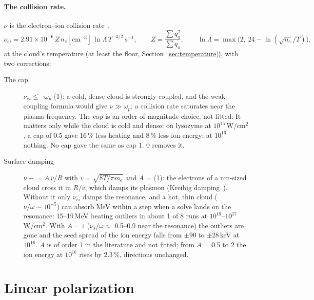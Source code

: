 \paragraph{The collision rate.}
$\nu$ is the electron--ion collision rate~\cite{nrl},
\begin{equation}
  \nu_{ei} = 2.91\times10^{-6}\,Z\,n_e[\mathrm{cm^{-3}}]\,\ln\Lambda\,T^{-3/2}\ \mathrm{s^{-1}},\qquad
  Z = \frac{\sum q_a^2}{\sum q_a},\qquad \ln\Lambda = \max\big(2,\ 24-\ln(\sqrt{n_e}/T)\big),
\end{equation}
at the cloud's temperature (at least the floor, Section~\ref{sec:temperature}), with two corrections:
\begin{description}
  \item[The cap] $\nu_{ei}\le$ $\cdot\omega_p$ (1): a cold, dense cloud is strongly coupled, and
    the weak-coupling formula would give $\nu\gg\omega_p$; a collision rate saturates near the plasma frequency.
    The cap is an order-of-magnitude choice, not fitted.
    It matters only while the cloud is cold and dense: on lysozyme at $10^{15}$\,W/cm$^2$, a cap of 0.5 gave 16\,\% less
    heating and 8\,\% less ion energy; at $10^{16}$ nothing.
    No cap gave the same as cap 1.
    0 removes it.
  \item[Surface damping] $\nu \mathrel{+}= A\,\bar v/R$ with $\bar v = \sqrt{8T/\pi m_e}$ and $A$ =
     (1): the electrons of a nm-sized cloud cross it in $R/\bar v$, which damps its plasmon
    (Kreibig damping~\cite{kreibig1995}).
    Without it only $\nu_{ei}$ damps the resonance, and a hot, thin cloud ($\nu/\omega\sim10^{-5}$) can absorb MeV
    within a step when a solve lands on the resonance: 15--19\,MeV heating outliers in about 1 of 8 runs at
    $10^{16}$--$10^{17}$\,W/cm$^2$.
    With $A=1$ ($\nu_s/\omega\approx$ 0.5--0.9 near the resonance) the outliers are gone and the seed spread of the ion
    energy falls from $\pm90$ to $\pm28$\,keV at $10^{16}$.
    $A$ is of order 1 in the literature and not fitted; from $A$ = 0.5 to 2 the ion energy at $10^{16}$ rises by 2.3\,\%,
    directions unchanged.
\end{description}

\section{Linear polarization}
\label{sec:polarization}


